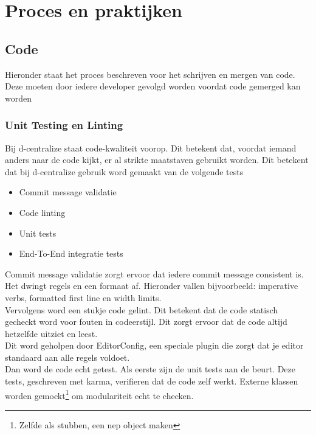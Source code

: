 \chapter{Proces en praktijken}

\section{Code}

Hieronder staat het proces beschreven voor het schrijven en mergen van code. Deze moeten door iedere developer gevolgd worden voordat code gemerged kan worden

\subsection{Unit Testing en Linting}

Bij d-centralize staat code-kwaliteit voorop. Dit betekent dat, voordat iemand anders naar de code kijkt, er al strikte maatstaven gebruikt worden. Dit betekent dat bij d-centralize gebruik word gemaakt van de volgende tests

\begin{itemize}
	\item Commit message validatie
	\item Code linting
	\item Unit tests
	\item End-To-End integratie tests
\end{itemize}

Commit message validatie zorgt ervoor dat iedere commit message consistent is. Het dwingt regels en een formaat af. Hieronder vallen bijvoorbeeld: imperative verbs, formatted first line en width limits. \\

Vervolgens word een stukje code gelint. Dit betekent dat de code statisch gecheckt word voor fouten in codeerstijl. Dit zorgt ervoor dat de code altijd hetzelfde uitziet en leest. \\

Dit word geholpen door EditorConfig, een speciale plugin die zorgt dat je editor standaard aan alle regels voldoet. \\

Dan word de code echt getest. Als eerste zijn de unit tests aan de beurt. Deze tests, geschreven met karma, verifieren dat de code zelf werkt. Externe klassen worden gemockt\footnote{Zelfde als stubben, een nep object maken} om modulariteit echt te checken. \\

